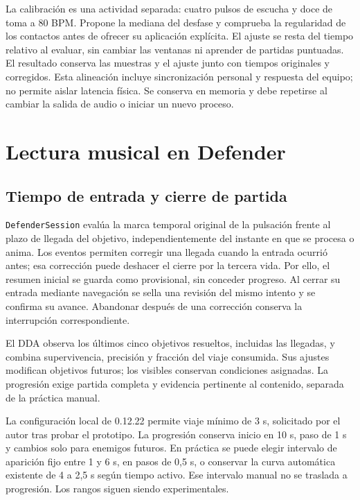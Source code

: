 La calibración es una actividad separada: cuatro pulsos de escucha y doce
de toma a 80 BPM. Propone la mediana del desfase y comprueba la regularidad
de los contactos antes de ofrecer su aplicación explícita. El ajuste se resta
del tiempo relativo al evaluar, sin cambiar las ventanas ni aprender de
partidas puntuadas. El resultado conserva las muestras y el ajuste junto con
tiempos originales y corregidos. Esta alineación incluye sincronización personal
y respuesta del equipo; no permite aislar latencia física. Se conserva en memoria
y debe repetirse al cambiar la salida de audio o iniciar un nuevo proceso.

\section{Lectura musical en Defender}
\label{sec:implementacion-defender}
\subsection{Tiempo de entrada y cierre de partida}
\label{sec:implementacion-defender-d3}
\texttt{DefenderSession} evalúa la marca temporal original de la pulsación frente
al plazo de llegada del objetivo, independientemente del instante en que se
procesa o anima. Los eventos permiten corregir una llegada cuando la entrada
ocurrió antes; esa corrección puede deshacer el cierre por la tercera vida.
Por ello, el resumen inicial se guarda como provisional, sin conceder progreso.
Al cerrar su entrada mediante navegación se sella una revisión del mismo
intento y se confirma su avance. Abandonar después de una corrección conserva
la interrupción correspondiente.

El DDA observa los últimos cinco objetivos resueltos, incluidas las llegadas,
y combina supervivencia, precisión y fracción del viaje consumida. Sus ajustes
modifican objetivos futuros; los visibles conservan condiciones asignadas.
La progresión exige partida completa y evidencia pertinente al contenido,
separada de la práctica manual.

La configuración local de 0.12.22 permite viaje mínimo de 3 s, solicitado por
el autor tras probar el prototipo. La progresión conserva inicio en 10 s,
paso de 1 s y cambios solo para enemigos futuros. En práctica se puede elegir
intervalo de aparición fijo entre 1 y 6 s, en pasos de 0,5 s, o conservar la
curva automática existente de 4 a 2,5 s según tiempo activo. Ese intervalo
manual no se traslada a progresión. Los rangos siguen siendo experimentales.

